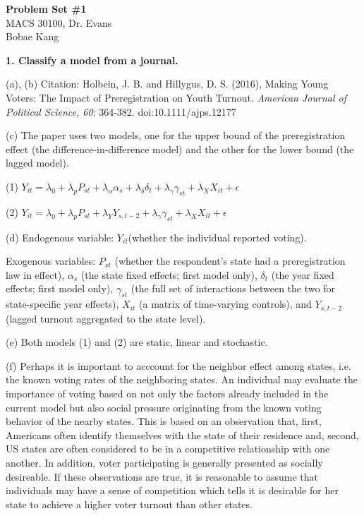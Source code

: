 \documentclass[letterpaper,12pt]{article}
\theoremstyle{definition}
\begin{document}
\begin{flushleft}
  \textbf{\large{Problem Set \#1}} \\
  MACS 30100, Dr. Evans \\
  Bobae Kang
\end{flushleft}

\vspace{5mm}

\noindent\textbf{1. Classify a model from a journal.}
\par
\noindent (a), (b) Citation: Holbein, J. B. and Hillygus, D. S. (2016), Making Young Voters: The Impact of Preregistration on Youth Turnout. \textit{American Journal of Political Science, 60}: 364-382. doi:10.1111/ajps.12177
\par\bigskip
\noindent (c) The paper uses two models, one for the upper bound of the preregistration effect (the difference-in-difference model) and the other for the lower bound (the lagged model).
\par\bigskip
(1) $Y_{it} = \lambda_{0} + \lambda_{p}P_{st} + \lambda_{\alpha}\alpha_{s} + \lambda_{\delta}\delta_{t} + \lambda_{\gamma}\gamma_{st} + \lambda_{X}X_{it} + \epsilon$
\par
(2) $Y_{it} = \lambda_{0} + \lambda_{p}P_{st} + \lambda_{Y}Y_{s, t-2} +  \lambda_{\gamma}\gamma_{st} + \lambda_{X}X_{it} + \epsilon$ 
\par\bigskip
\noindent (d) Endogenous variable: $Y_{it}$(whether the individual reported voting).
\par\noindent
Exogenous variables: $P_{st}$ (whether the respondent’s state had a preregistration law in effect), $\alpha_{s}$ (the state fixed effects; first model only), $\delta_{t}$ (the year fixed effects; first model only), $\gamma_{st}$ (the full set of interactions between the two for state-specific year effects), $X_{it}$ (a matrix of time-varying controls), and $Y_{s, t-2}$ (lagged turnout aggregated to the state level).
\par\bigskip
\noindent (e) Both models (1) and (2) are static, linear and stochastic.
\par\bigskip
\noindent (f) Perhaps it is important to acccount for the neighbor effect among states, i.e. the known voting rates of the neighboring states. An individual may evaluate the importance of voting based on not only the factors already included in the current model but also social pressure originating from the known voting behavior of the nearby states. This is based on an observation that, first, Americans often identify themselves with the state of their residence and, second, US states are often considered to be in a competitive relationship with one another. In addition, voter participating is generally presented as socially desireable. If these observations are true, it is reasonable to assume that individuals may have a sense of competition which tells it is desirable for her state to achieve a higher voter turnout than other states.
\par\bigskip
\par\bigskip
\end{document}
